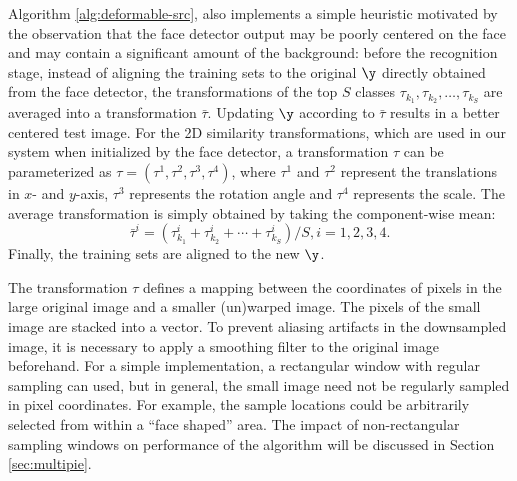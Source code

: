 Algorithm \ref{alg:deformable-src}, also implements a simple heuristic
motivated by the observation that the face detector output may be poorly
centered on the face and may contain a significant amount of the background:
before the recognition stage, instead of aligning the training sets to the
original $\y$ directly obtained from the face detector, the transformations of
the top $S$ classes $\tau_{k_1}, \tau_{k_2}, \ldots, \tau_{k_S}$ are averaged
into a transformation $\bar{\tau}$.  Updating $\y$ according to $\bar{\tau}$
results in a better centered test image. For the 2D similarity transformations,
which are used in our system when initialized by the face detector, a
transformation $\tau$ can be parameterized as $\tau = (\tau^1, \tau^2, \tau^3,
\tau^4)$, where $\tau^1$ and $\tau^2$ represent the translations in $x$- and
$y$-axis, $\tau^3$ represents the rotation angle and $\tau^4$ represents the
scale. The average transformation is simply obtained by taking the
component-wise mean:
\begin{displaymath}
\bar{\tau}^i = (\tau_{k_1}^i + \tau_{k_2}^i + \cdots +
\tau_{k_S}^i) / S, i = 1,2,3,4.
\end{displaymath}
Finally, the training sets are aligned to the new $\y$.



The transformation $\tau$ defines a mapping between the coordinates of pixels
in the large original image and a smaller (un)warped image. The pixels of the
small image are stacked into a vector. To prevent aliasing artifacts in the
downsampled image, it is necessary to apply a smoothing filter to the original
image beforehand. For a simple implementation, a rectangular window with
regular sampling can used, but in general, the small image need not be
regularly sampled in pixel coordinates.  For example, the sample locations
could be arbitrarily selected from within a ``face shaped'' area. The impact of
non-rectangular sampling windows on performance of the algorithm will be
discussed in Section \ref{sec:multipie}.

